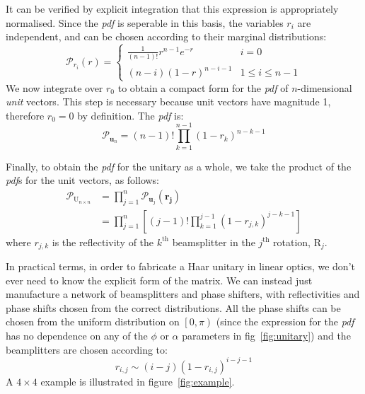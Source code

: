 \documentclass[aps,prl,twocolumn]{revtex4}
\renewcommand{\vec}[1]{\mathbf{#1}}
\newcommand{\mat}[1]{\mathrm{#1}}
\newcommand{\by}{\times}
\newcommand{\of}[1]{\!\left(#1\right)}
\newcommand{\pdf}{{\it pdf}}
\newcommand{\prob}[1]{\mathcal{#1}}
\begin{document}
It can be verified by explicit integration that this expression is appropriately
normalised. Since the \pdf{} is seperable in this basis, the variables \( r_i
\) are independent, and can be chosen according to their marginal distributions:
\begin{equation}
  \prob{P}_{r_i} \of{ r } = \left\{ \begin{matrix}
    \frac{1}{ \left( n-1 \right)! } r^{n-1} e^{-r} & i=0 \\
    \left( n-i \right) \left( 1-r \right)^{n-i-1} & 1 \leq i \leq n-1
  \end{matrix} \right.
\end{equation}
We now integrate over \(r_{0}\) to obtain a compact form for the \pdf{} of
\(n\)-dimensional \emph{unit} vectors. This step is necessary because unit
vectors have magnitude 1, therefore \(r_0=0\) by definition. The \pdf{} is:
\begin{equation}
  \prob{P}_{ \vec{u}_n } = \left( n-1 \right)! \prod_{k=1}^{n-1} \left( 1-r_k
  \right)^{n-k-1}
\end{equation}

Finally, to obtain the \pdf{} for the unitary as a whole, we take the product
of the \pdf{}s for the unit vectors, as follows:
\begin{align*}
  \prob{P}_{\mat{U}_{n \by n}} &= \prod_{j=1}^{n} \prob{P}_{\vec{u}_j}
  \of{\vec{r_j}} \\
  &= \prod_{j=1}^{n} \left[ \left( j-1 \right)! \prod_{k=1}^{j-1} \left(
  1-r_{j,k} \right)^{j-k-1} \right]
\end{align*}
where \( r_{j,k} \) is the reflectivity of the \( k^{\text{th}} \) beamsplitter
in the \( j^{\text{th}} \) rotation, \( \mat{R}_j \).

In practical terms, in order to fabricate a Haar unitary in linear optics, we
don't ever need to know the explicit form of the matrix. We can instead just
manufacture a network of beamsplitters and phase shifters, with reflectivities
and phase shifts chosen from the correct distributions. All the phase shifts can
be chosen from the uniform distribution on \( \left[ 0,\pi \right) \) (since the
expression for the \pdf{} has no dependence on any of the \(\phi\) or \(\alpha\)
parameters in fig~\ref{fig:unitary}) and the
beamplitters are chosen according to:
\begin{equation}
  r_{i,j} \sim \left( i-j \right) \left( 1-r_{i,j} \right)^{i-j-1}
\end{equation}
A \( 4 \by 4 \) example is illustrated in figure~\ref{fig:example}.
\end{document}
